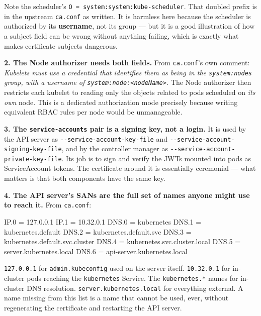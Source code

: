 \documentclass[11pt,oneside]{report}
\begin{document}
Note the scheduler's
\texttt{O\ =\ system:}\allowbreak{}\texttt{system:}\allowbreak{}\texttt{kube-}\allowbreak{}\texttt{scheduler}.
That doubled prefix
is in the upstream
\texttt{ca.conf} as
written. It is
harmless here
because the
scheduler is
authorized by its
\textbf{username},
not its group ---
but it is a good
illustration of how
a subject field can
be wrong without
anything failing,
which is exactly
what makes
certificate subjects
dangerous.

\textbf{2. The Node
authorizer needs
both fields.} From
\texttt{ca.conf}'s
own comment:
\emph{Kubelets must
use a credential
that identifies them
as being in the
\texttt{system:nodes}
group, with a
username of
\texttt{system:}\allowbreak{}\texttt{node:}\allowbreak{}\texttt{\textless{}nodeName\textgreater{}}.}
The Node authorizer
then restricts each
kubelet to reading
only the objects
related to pods
scheduled on
\emph{its own} node.
This is a dedicated
authorization mode
precisely because
writing equivalent
RBAC rules per node
would be
unmanageable.

\textbf{3. The
\texttt{service-}\allowbreak{}\texttt{accounts}
pair is a signing
key, not a login.}
It is used by the
API server as
\texttt{-\/-service-}\allowbreak{}\texttt{account-}\allowbreak{}\texttt{key-}\allowbreak{}\texttt{file}
and
\texttt{-\/-service-}\allowbreak{}\texttt{account-}\allowbreak{}\texttt{signing-}\allowbreak{}\texttt{key-}\allowbreak{}\texttt{file},
and by the
controller manager
as
\texttt{-\/-service-}\allowbreak{}\texttt{account-}\allowbreak{}\texttt{private-}\allowbreak{}\texttt{key-}\allowbreak{}\texttt{file}.
Its job is to sign
and verify the JWTs
mounted into pods as
ServiceAccount
tokens. The
certificate around
it is essentially
ceremonial --- what
matters is that both
components have the
same key.

\textbf{4. The API
server's SANs are
the full set of
names anyone might
use to reach it.}
From
\texttt{ca.conf}:

\begin{outlst}
IP.0  = 127.0.0.1
IP.1  = 10.32.0.1
DNS.0 = kubernetes
DNS.1 = kubernetes.default
DNS.2 = kubernetes.default.svc
DNS.3 = kubernetes.default.svc.cluster
DNS.4 = kubernetes.svc.cluster.local
DNS.5 = server.kubernetes.local
DNS.6 = api-server.kubernetes.local
\end{outlst}

\texttt{127.0.0.1}
for
\texttt{admin.}\allowbreak{}\texttt{kubeconfig}
used on the server
itself.
\texttt{10.32.0.1}
for in-cluster pods
reaching the
\texttt{kubernetes}
Service. The
\texttt{kubernetes.*}
names for in-cluster
DNS resolution.
\texttt{server.}\allowbreak{}\texttt{kubernetes.}\allowbreak{}\texttt{local}
for everything
external. A name
missing from this
list is a name that
cannot be used,
ever, without
regenerating the
certificate and
restarting the API
server.
\end{document}
